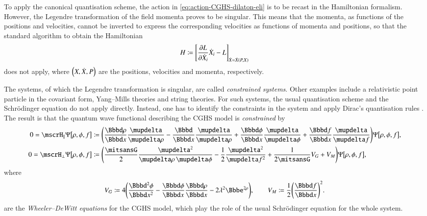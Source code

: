To apply the canonical quantisation scheme, the action in
\cref{eq:action-CGHS-dilaton-eli} is to be recast in the Hamiltonian formalism.
However, the Legendre transformation of the field momenta proves to be 
singular. This means that the momenta, as functions of the positions and 
velocities, cannot be inverted to express the corresponding velocities as 
functions of momenta and positions, so that the standard algorithm to obtain 
the Hamiltonian
\begin{equation}
H \coloneqq {\left[{\frac{\partial{L}}{\partial{\dot{X}_i}}}\dot{X}_i - L\right]}_{\dot{X}
= {\dot{X}}\mathopen{}\left(P,X\right)\mathclose{}}
\end{equation}
does not apply, where ${\left(X, \dot{X}, P\right)}$ are the positions, velocities and 
momenta, respectively.

The systems, of which the Legendre transformation is singular, are called 
\emph{constrained systems}. Other examples include a relativistic point 
particle in the covariant form, Yang--Mills theories and string theories. For 
such systems, the usual quantisation scheme and the Schrödinger equation do 
not apply directly. Instead, one has to identify the constraints in the system 
and apply Dirac's quantisation rules \cite{dirac1964lectures,Gitman1990}. The 
result is that the quantum wave functional describing the CGHS model is 
\emph{constrained} by
\begin{align}
0 = \mscrH_\parallel\sfun{\Psi}{\rho,\phi,f} &\coloneqq
\rbr{\frde{\rho}{x}\frdva{}{\rho} - \frde{}{x}\frdva{}{\rho} 
+\frde{\phi}{x}\frdva{}{\phi} + \frde{f}{x}\frdva{}{f}}\sfun{\Psi}{\rho,\phi,f},
\label{eq:hpara}\\
0 = \mscrH_\perp\sfun{\Psi}{\rho,\phi,f} &\coloneqq
\rbr{\frac{\nG}{2}\frdva{^2}{\rho\,\dva\phi} - \frac{1}{2}\frdva{^2}{f^2} 
+\frac{1}{2\nG}V_G + V_M}\sfun{\Psi}{\rho,\phi,f},
\label{eq:hperp}
\end{align}
where
\begin{equation}
V_G \coloneqq 4\rbr{\frde{^2\phi}{x^2} - \frde{\phi}{x}\frde{\rho}{x} - 
2\lambda^2 \ee^{2\rho}},\qquad
V_M \coloneqq\frac{1}{2}\rbr{\frde{f}{x}}^2.
\end{equation}
 are the \emph{Wheeler--DeWitt equations} for the CGHS 
model, which play the role of the usual Schrödinger equation for the whole 
system.

